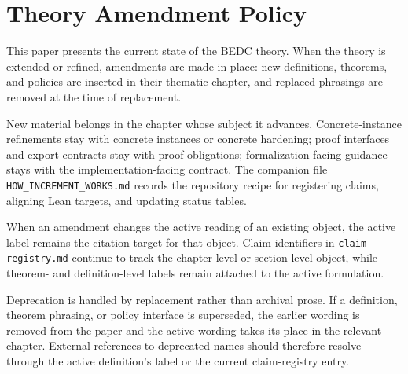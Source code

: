 \chapter{Theory Amendment Policy}
\label{ch:theory-amendment-policy}

This paper presents the current state of the BEDC theory. When the theory is extended or refined, amendments are made in place: new definitions, theorems, and policies are inserted in their thematic chapter, and replaced phrasings are removed at the time of replacement.

New material belongs in the chapter whose subject it advances. Concrete-instance refinements stay with concrete instances or concrete hardening; proof interfaces and export contracts stay with proof obligations; formalization-facing guidance stays with the implementation-facing contract. The companion file \texttt{HOW\_INCREMENT\_WORKS.md} records the repository recipe for registering claims, aligning Lean targets, and updating status tables.

When an amendment changes the active reading of an existing object, the active label remains the citation target for that object. Claim identifiers in \texttt{claim-registry.md} continue to track the chapter-level or section-level object, while theorem- and definition-level labels remain attached to the active formulation.

Deprecation is handled by replacement rather than archival prose. If a definition, theorem phrasing, or policy interface is superseded, the earlier wording is removed from the paper and the active wording takes its place in the relevant chapter. External references to deprecated names should therefore resolve through the active definition's label or the current claim-registry entry.
